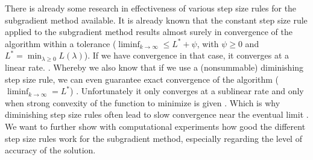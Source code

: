 \documentclass[12pt,oneside,ngerman,reqno,a4paper]{article}
\begin{document}
\renewcommand{\thepage}{C-\Roman{page}}
There is already some research in effectiveness of various step size rules for the subgradient method available. It is already known that the constant step size rule applied to the subgradient method results almost surely in convergence of the algorithm within a tolerance ($\liminf_{k\to \infty} \le L^* + \psi$, with $\psi \ge 0$ and $L^*=\min_{\lambda \ge 0} L(\lambda)$)\cite{StochasticSubgradientMethod_YaohuaHu}.  If we have convergence in that case, it converges at a linear rate. \cite{SubgradientMethod_Ratliff}. Whereby we also know that if we use a (nonsummable) diminishing step size rule, we can even guarantee exact convergence of the algorithm ($\liminf_{k\to\infty} = L^*$) \cite{StochasticSubgradientMethod_YaohuaHu}. Unfortunately it only converges at a sublinear rate and only when strong convexity of the function to minimize is given \cite{SubgradientMethod_Ratliff}. Which is why diminishing step size rules often lead to slow convergence near the eventual limit \cite{IncrementalGradientMethodConstant_Blatt}. We want to further show with computational experiments how good the different step size rules work for the subgradient method, especially regarding the level of accuracy of the solution. 
\end{document}
